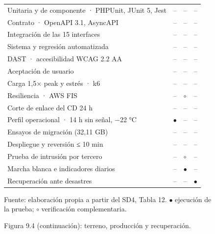 \begin{figure}[p]
\centering
\begingroup\LFXcuerpotabla
\renewcommand{\arraystretch}{1.2}
\begin{tabularx}{\textwidth}{Y L{1.8cm} L{1.9cm} L{2.3cm}}
\toprule
{} &  &  &  \\\midrule
Unitaria y de componente · PHPUnit, JUnit 5, Jest & -- & -- & -- \\
Contrato · OpenAPI 3.1, AsyncAPI & -- & -- & -- \\
Integración de las 15 interfaces & -- & -- & -- \\
Sistema y regresión automatizada & -- & -- & -- \\
DAST · accesibilidad WCAG 2.2 AA & -- & -- & -- \\
Aceptación de usuario & -- & -- & -- \\
Carga 1,5× peak y estrés · k6 & -- & -- & -- \\
Resiliencia · AWS FIS & -- & $\circ$ & -- \\
Corte de enlace del CD 24 h & -- & -- & -- \\
Perfil operacional · 14 h sin señal, −22 °C & $\bullet$ & -- & -- \\
Ensayos de migración (32,11 GB) & -- & -- & -- \\
Despliegue y reversión ≤ 10 min & -- & -- & -- \\
Prueba de intrusión por tercero & -- & $\circ$ & -- \\
Marcha blanca e indicadores diarios & -- & $\bullet$ & -- \\
Recuperación ante desastres & -- & -- & $\bullet$ \\
\bottomrule\end{tabularx}\endgroup
\caption*{Figura 9.4 (continuación): terreno, producción y recuperación.}
{\fontsize{9.5pt}{12pt}\selectfont Fuente: elaboración propia a partir del SD4, Tabla 12. $\bullet$ ejecución de la prueba; $\circ$ verificación complementaria.\par}
\end{figure}
\clearpage
